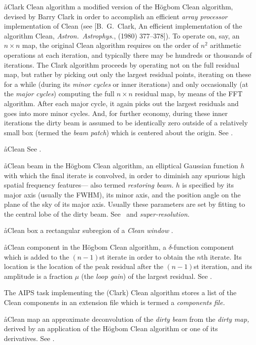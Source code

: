 \aa{Clark Clean algorithm}
a modified version of the H\"ogbom Clean algorithm, devised
by Barry Clark in order to accomplish an efficient {\it array processor}
implementation of Clean (see [B.~G.~Clark, An efficient implementation of
the algorithm Clean, {\it Astron.\ Astrophys.}, 
(1980) 377--378]).
To operate on, say, an $n\times n$ map, the original Clean algorithm
requires on the order of $n^2$ arithmetic operations at each iteration,
and typically there may be hundreds or thousands of iterations.
The Clark algorithm proceeds by operating not on the full residual
map, but rather by picking out only the largest residual points,
iterating on these for a while (during its {\it minor cycles} or
inner iterations) and only occasionally (at the {\it major cycles}\/)
computing the full $n\times n$ residual map, by means of the
FFT algorithm.
After each major cycle, it again picks out the largest residuals
and goes into more minor cycles.
And, for further economy, during these inner iterations
the dirty beam is assumed to be identically zero outside of a
relatively small box (termed the {\it beam patch}\/) which is centered
about the origin.
See \hca.

\aa{Clean} See \hca.

\aa{Clean beam}
in the H\"ogbom Clean algorithm, an elliptical Gaussian function
$h$ with which the final iterate is convolved, in order to
diminish any spurious high spatial frequency features---%
also termed {\it restoring beam.}
$h$ is specified by its major axis (usually the FWHM), its minor axis,
and the position angle on the plane of the sky of its major axis.
Usually these parameters are set by fitting to the central lobe
of the dirty beam.
See \hca\ and {\it super-resolution.}

\aa{Clean box}
a rectangular subregion of a {\it Clean window} \qv.

\aa{Clean component}
in the H\"ogbom Clean algorithm, a $\delta$-function component which
is added to the $(n-1)$st iterate in order to obtain
the $n$th iterate.
Its location is the location of the peak residual after the
$(n-1)$st iteration, and its amplitude is a fraction
$\mu$ (the {\it loop gain}\/) of the largest residual.
See \hca.
\par
The AIPS task implementing the (Clark) Clean algorithm stores a list
of the Clean components in an extension file which is termed
a {\it components file.}

\aa{Clean map}
an approximate deconvolution of the {\it dirty beam}
from the {\it dirty map,} derived by an application of
the H\"ogbom Clean algorithm or one of its derivatives.
See \hca.

